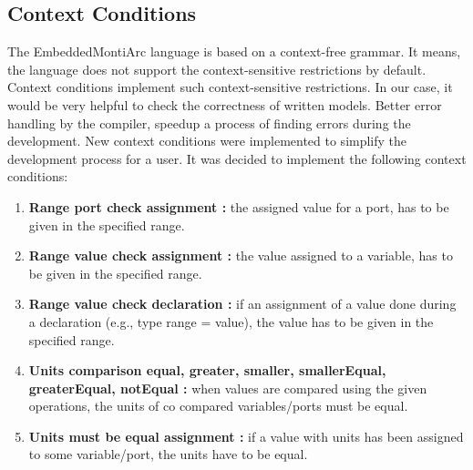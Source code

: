\subsection{Context Conditions}
The EmbeddedMontiArc language is based on a context-free grammar. It means, the language does not support the context-sensitive restrictions by default. Context conditions implement such context-sensitive restrictions. In our case, it would be very helpful to check the correctness of written models. Better error handling by the compiler, speedup a process of finding errors during the development. New context conditions were implemented to simplify the development process for a user. It was decided to implement the following context conditions:
\begin{enumerate}
    \item \textbf{Range port check assignment :} the assigned value for a port, has to be given in the specified range.
    \item \textbf{Range value check assignment :} the value assigned to a variable, has to be given in the specified range.
    \item \textbf{Range value check declaration :} if an assignment of a value done during a declaration (e.g., type range = value), the value has to be given in the specified range.
    \item \textbf{Units comparison equal, greater, smaller, smallerEqual, greaterEqual, notEqual :} when values are compared using the given operations, the units of co compared variables/ports must be equal.
    \item \textbf{Units must be equal assignment :} if a value with units has been assigned to some variable/port, the units have to be equal.  
\end{enumerate}

